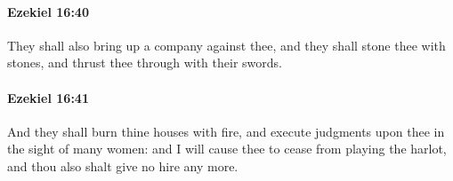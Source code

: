 		\paragraph{Ezekiel 16:40} %
			\label{EZEKIEL-16-40}

			They shall also bring up a company against thee, and they shall stone thee with stones, and thrust thee through with their swords.


		\paragraph{Ezekiel 16:41} %
			\label{EZEKIEL-16-41}

			And they shall burn thine houses with fire, and execute judgments upon thee in the sight of many women: and I will cause thee to cease from playing the harlot, and thou also shalt give no hire any more.


